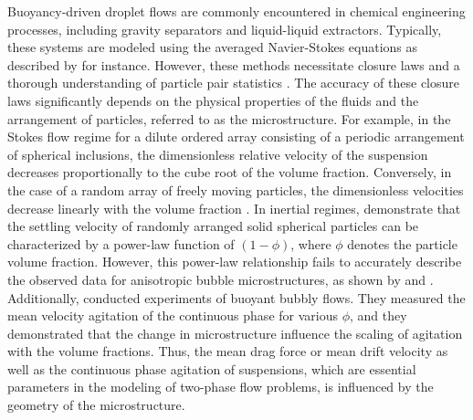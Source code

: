 Buoyancy-driven droplet flows are commonly encountered in chemical engineering processes, including gravity separators and liquid-liquid extractors. Typically, these systems are modeled using the averaged Navier-Stokes equations as described by \citep{castellano2019} for instance. However, these methods necessitate closure laws and a thorough understanding of particle pair statistics \citep{simonin1996}. The accuracy of these closure laws significantly depends on the physical properties of the fluids and the arrangement of particles, referred to as the microstructure. %
For example, in the Stokes flow regime for a dilute ordered array consisting of a periodic arrangement of spherical inclusions, the dimensionless relative velocity of the suspension decreases proportionally to the cube root of the volume fraction. Conversely, in the case of a random array of freely moving particles, the dimensionless velocities decrease linearly with the volume fraction \citep{saffman1973}.
In inertial regimes, \citet{yin2007} demonstrate that the settling velocity of randomly arranged solid spherical particles can be characterized by a power-law function of $(1-\phi)$, where $\phi$ denotes the particle volume fraction.
However, this power-law relationship fails to accurately describe the observed data for anisotropic bubble microstructures, as shown by \citet{yin2008lattice} and \citet{loisy2017}.
Additionally, \citet{cartellier2009induced} conducted experiments of buoyant bubbly flows. 
They measured the mean velocity agitation of the continuous phase for various $\phi$, 
and they demonstrated that the change in microstructure influence the scaling of agitation with the volume fractions. 
Thus, the mean drag force or mean drift velocity as well as the continuous phase agitation of suspensions, which are essential parameters in the modeling of two-phase flow problems, is influenced by the geometry of the microstructure.




